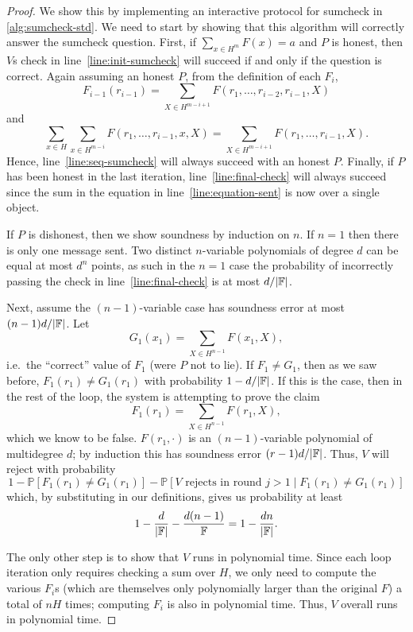 \documentclass[english,12pt]{reedthesis}
\theoremstyle{plain}
\theoremstyle{definition}
\theoremstyle{remark}
\DeclarePairedDelimiter{\abs}{\lvert}{\rvert}
\begin{document}
\begin{proof}
  We show this by implementing an interactive protocol for sumcheck in
  \cref{alg:sumcheck-std}. We need to start by showing that this algorithm will
  correctly answer the sumcheck question. First, if $\sum_{x \in H^{m}}F(x) = a$ and
  $P$ is honest, then $V$s check in line~\ref{line:init-sumcheck} will succeed
  if and only if the question is correct. Again assuming an honest $P$, from the
  definition of each $F_{i}$,
  \[
    F_{i-1}(r_{i-1}) = \sum_{X \in H^{m-i+1}}F(r_{1}, \ldots, r_{i-2}, r_{i-1}, X)
  \]
  and
  \[
    \sum_{x \in H}\sum_{x \in H^{m-i}}F(r_{1}, \ldots, r_{i-1}, x, X) = \sum_{X \in H^{m-i+1}}F(r_{1}, \ldots, r_{i-1}, X).
  \]
  Hence, line~\ref{line:seq-sumcheck} will always succeed with an honest $P$.
  Finally, if $P$ has been honest in the last iteration,
  line~\ref{line:final-check} will always succeed since the sum in the equation
  in line~\ref{line:equation-sent} is now over a single object.

  If $P$ is dishonest, then we show soundness by induction on $n$. If $n = 1$
  then there is only one message sent. Two distinct $n$-variable polynomials of
  degree $d$ can be equal at most $d^{n}$ points, as such in the $n = 1$ case
  the probability of incorrectly passing the check in
  line~\ref{line:final-check} is at most $d/\abs{\mathbb{F}}$.

  Next, assume the $(n - 1)$-variable case has soundness error at most
  $(n - 1)d/\abs{\mathbb{F}}$. Let
  \[
    G_{1}(x_{1}) = \sum_{X \in H^{n-1}}F(x_{1}, X),
  \]
  i.e.\ the ``correct'' value of $F_{1}$ (were $P$ not to lie). If
  $F_{1} \ne G_{1}$, then as we saw before, $F_{1}(r_{1}) \ne G_{1}(r_{1})$ with
  probability $1 - d/\abs{\mathbb{F}}$. If this is the case, then in the rest of
  the loop, the system is attempting to prove the claim
  \[
    F_{1}(r_{1}) = \sum_{X \in H^{n-1}}F(r_{1}, X),
  \]
  which we know to be false. $F(r_{1}, \cdot)$ is an $(n - 1)$-variable polynomial
  of multidegree $d$; by induction this has soundness error
  $(r - 1)d/\abs{\mathbb{F}}$. Thus, $V$ will reject with probability
  \[
    1 - \mathbb{P}[F_{1}(r_{1}) \ne G_{1}(r_{1})] - \mathbb{P}[V \text{ rejects in round } j > 1 \mid F_{1}(r_{1}) \ne G_{1}(r_{1})]
  \]
  which, by substituting in our definitions, gives us probability at least
  \[
    1 - \frac{d}{\abs{\mathbb{F}}} - \frac{d(n - 1)}{\mathbb{F}} = 1 - \frac{dn}{\abs{\mathbb{F}}}.
  \]

  The only other step is to show that $V$ runs in polynomial time. Since each
  loop iteration only requires checking a sum over $H$, we only need to compute
  the various $F_{i}$s (which are themselves only polynomially larger than the
  original $F$) a total of $nH$ times; computing $F_{i}$ is also in polynomial
  time. Thus, $V$ overall runs in polynomial time.
\end{proof}
\end{document}
